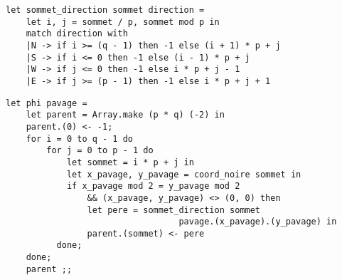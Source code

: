\documentclass{article}
\begin{document}
\begin{question}
    \item \begin{verbatim}
let sommet_direction sommet direction =
    let i, j = sommet / p, sommet mod p in
    match direction with
    |N -> if i >= (q - 1) then -1 else (i + 1) * p + j
    |S -> if i <= 0 then -1 else (i - 1) * p + j
    |W -> if j <= 0 then -1 else i * p + j - 1
    |E -> if j >= (p - 1) then -1 else i * p + j + 1       
    \end{verbatim}

    \item \begin{verbatim}
let phi pavage = 
    let parent = Array.make (p * q) (-2) in
    parent.(0) <- -1;
    for i = 0 to q - 1 do
        for j = 0 to p - 1 do
            let sommet = i * p + j in
            let x_pavage, y_pavage = coord_noire sommet in
            if x_pavage mod 2 = y_pavage mod 2
                && (x_pavage, y_pavage) <> (0, 0) then
                let pere = sommet_direction sommet 
                                  pavage.(x_pavage).(y_pavage) in
                parent.(sommet) <- pere
          done;
    done;
    parent ;;       
    \end{verbatim}
\end{question}
\end{document}
